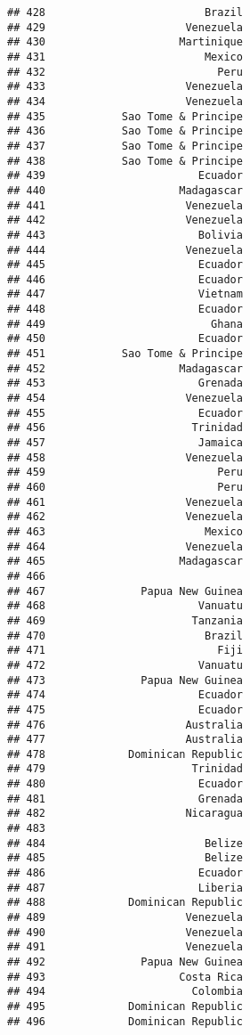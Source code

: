 \documentclass[
]{article}
\begin{document}
\begin{verbatim}
## 428                         Brazil
## 429                      Venezuela
## 430                     Martinique
## 431                         Mexico
## 432                           Peru
## 433                      Venezuela
## 434                      Venezuela
## 435            Sao Tome & Principe
## 436            Sao Tome & Principe
## 437            Sao Tome & Principe
## 438            Sao Tome & Principe
## 439                        Ecuador
## 440                     Madagascar
## 441                      Venezuela
## 442                      Venezuela
## 443                        Bolivia
## 444                      Venezuela
## 445                        Ecuador
## 446                        Ecuador
## 447                        Vietnam
## 448                        Ecuador
## 449                          Ghana
## 450                        Ecuador
## 451            Sao Tome & Principe
## 452                     Madagascar
## 453                        Grenada
## 454                      Venezuela
## 455                        Ecuador
## 456                       Trinidad
## 457                        Jamaica
## 458                      Venezuela
## 459                           Peru
## 460                           Peru
## 461                      Venezuela
## 462                      Venezuela
## 463                         Mexico
## 464                      Venezuela
## 465                     Madagascar
## 466                               
## 467               Papua New Guinea
## 468                        Vanuatu
## 469                       Tanzania
## 470                         Brazil
## 471                           Fiji
## 472                        Vanuatu
## 473               Papua New Guinea
## 474                        Ecuador
## 475                        Ecuador
## 476                      Australia
## 477                      Australia
## 478             Dominican Republic
## 479                       Trinidad
## 480                        Ecuador
## 481                        Grenada
## 482                      Nicaragua
## 483                               
## 484                         Belize
## 485                         Belize
## 486                        Ecuador
## 487                        Liberia
## 488             Dominican Republic
## 489                      Venezuela
## 490                      Venezuela
## 491                      Venezuela
## 492               Papua New Guinea
## 493                     Costa Rica
## 494                       Colombia
## 495             Dominican Republic
## 496             Dominican Republic

\end{verbatim}
\end{document}
